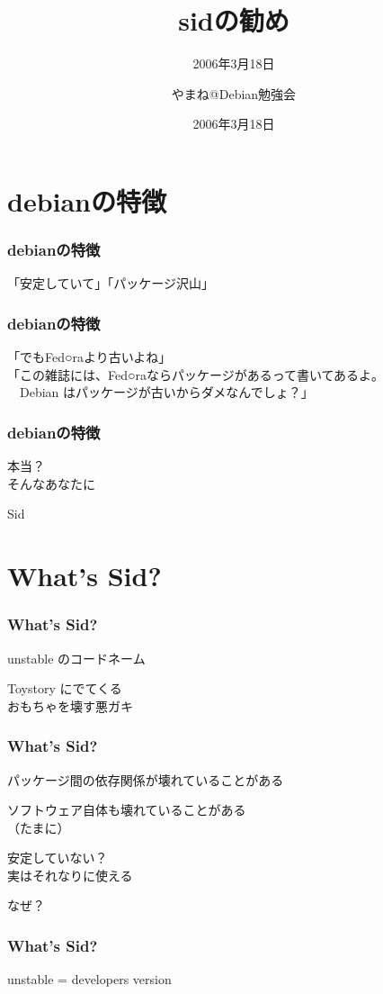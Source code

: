 \documentclass[cjk,dvipdfmx]{beamer}
\title[Debian 勉強会]{sidの勧め}
\subtitle{2006年3月18日}
\author{やまね@Debian勉強会}
\date{2006年3月18日}
\begin{document}
\frame{\titlepage{}}

 \section{debianの特徴}
 
 \begin{frame}
  \frametitle{debianの特徴}
  「安定していて」「パッケージ沢山」
  
 \end{frame}
 
 
 
 \begin{frame}
  \frametitle{debianの特徴}
  「でもFed○raより古いよね」\\
  「この雑誌には、Fed○raならパッケージがあるって書いてあるよ。\\
  　Debian はパッケージが古いからダメなんでしょ？」
 \end{frame}
 
 \begin{frame}
  \frametitle{debianの特徴}
  本当？\\
  そんなあなたに
  
  Sid
 \end{frame}
 

 \section{What's Sid?}
 \begin{frame}
  \frametitle{ What's Sid?}
  
  unstable のコードネーム
  
  Toystory にでてくる\\
  おもちゃを壊す悪ガキ
 \end{frame}
 
 \begin{frame}
  \frametitle{ What's Sid?}
  
  パッケージ間の依存関係が壊れていることがある
  
  ソフトウェア自体も壊れていることがある\\
  （たまに）
  
  安定していない？\\
  実はそれなりに使える
  
  なぜ？
 \end{frame}
 
 \begin{frame}
  \frametitle{ What's Sid?}
  unstable = developers version
 \end{frame}
\end{document}
